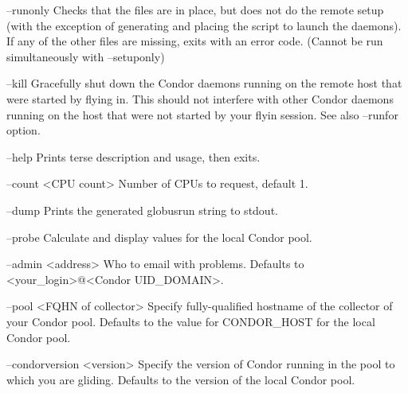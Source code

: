 --runonly
   Checks that the files are in place, but does not do the remote setup
   (with the exception of generating and placing the script to launch
   the daemons). If any of the other files are missing, exits with
   an error code.
   (Cannot be run simultaneously with --setuponly)

--kill
   Gracefully shut down the Condor daemons running on the remote host
   that were started by flying in. This should not interfere with other
   Condor daemons running on the host that were not started by your
   flyin session.
   See also --runfor option.

--help
   Prints terse description and usage, then exits.

--count <CPU count>
	Number of CPUs to request, default 1.

--dump		
	Prints the generated globusrun string to stdout.

--probe
	Calculate and display values for the local Condor pool.

--admin <address>
	Who to email with problems. Defaults to <your_login>@<Condor UID_DOMAIN>.

--pool <FQHN of collector>
	Specify fully-qualified hostname of the collector of your Condor pool.
	Defaults to the value for CONDOR_HOST for the local Condor pool.

--condorversion <version>
	Specify the version of Condor running in the pool to which you are gliding.
	Defaults to the version of the local Condor pool.
